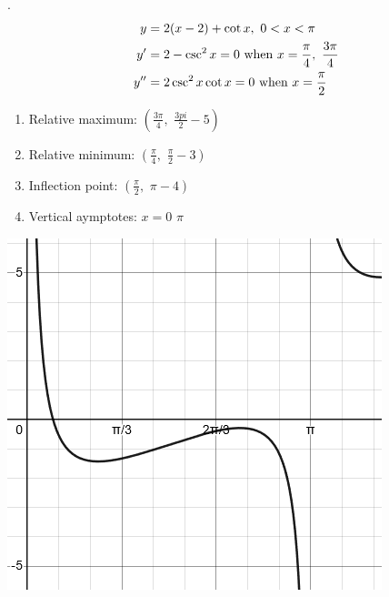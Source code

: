 \documentclass[11pt]{article}
\newcommand*{\vs}{\vspace{1cm}}
\newcommand*{\next}{\noindent}
\newcommand*{\set}{\setcounter{equation}{0}}
\begin{document}
\vs\next
42.\begin{align}
    \set
    y&=2(x-2)+\cot x,\,\,0<x<\pi\\
    y'&=2-\csc^2 x=0\,\,\text{when}\,\, x=\frac{\pi}{4},\,\,\frac{3\pi}{4}\\
    y''&=2\csc^2 x\cot x=0\,\,\text{when}\,\, x=\frac{\pi}{2}
\end{align}
\begin{enumerate}
    \item Relative maximum: $\left(\frac{3\pi}{4},\,\,\frac{3pi}{2}-5\right)$
    \item Relative minimum: $\left(\frac{\pi}{4},\,\,\frac{\pi}{2}-3\right)$
    \item Inflection point: $\left(\frac{\pi}{2},\,\, \pi-4\right)$
    \item Vertical aymptotes: $x=0\,\,\pi$
\end{enumerate}
\includegraphics{42.png}
\end{document}
